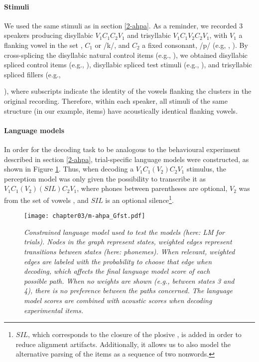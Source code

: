 \paragraph{Stimuli}
We used the same stimuli as in section \ref{2-ahpa}. As a reminder, we recorded 3 speakers producing disyllabic $V_{1}C_{1}C_{2}V_{1}$ and trisyllabic $V_{1}C_{1}V_{2}C_{2}V_{1}$, with $V_{1}$ a flanking vowel in the set , $C_{1}$  or /k/, and $C_{2}$ a fixed consonant, /p/ (e.g, , ). By cross-splicing the disyllabic natural control items (e.g., ), we obtained disyllabic spliced control items (e.g., \texorpdfstring{}{}), disyllabic spliced test stimuli (e.g., \texorpdfstring{}{}), and trisyllabic spliced fillers (e.g., {), where subscripts indicate the identity of the vowels flanking the clusters in the original recording. Therefore, within each speaker, all stimuli of the same structure (in our example,  items) have acoustically identical flanking vowels.
  
\paragraph{Language models}
In order for the decoding task to be analogous to the behavioural experiment described in section \ref{2-ahpa}, trial-specific language models were constructed, as shown in Figure \ref{fig:m-ahpa_G}. Thus, when decoding a $V_{1}C_{1}(V_{2})C_{2}V_{1}$ stimulus, the perception model was only given the possibility to transcribe it as $V_{1}C_{1}(V_{2})(SIL)C_{2}V_{1}$, where phones between parentheses are optional, $V_{2}$ was from the set of vowels , and $SIL$ is an optional silence\footnote{$SIL$, which corresponds to the closure of the plosive , is added in order to reduce alignment artifacts. Additionally, it allows us to also model the alternative parsing of the items as a sequence of two nonwords.}. 

\begin{figure}[htb]
    \centering
    \texttt{[image: chapter03/m-ahpa\_Gfst.pdf]}
    \caption{\textit{Constrained language model used to test the models (here: LM for  trials). Nodes in the graph represent states, weighted edges represent transitions between states (here: phonemes). When relevant, weighted edges are labeled with the probability to choose that edge when decoding, which affects the final language model score of each possible path. When no weights are shown (e.g., between states 3 and 4), there is no preference between the paths concerned. The language model scores are combined with acoustic scores when decoding experimental items.}}
    \label{fig:m-ahpa_G}
\end{figure}

}
